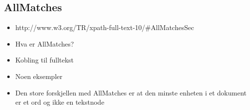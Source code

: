 \subsection{AllMatches}
\label{sect:theory:xquery:allmatches}
\begin{itemize}
  \item http://www.w3.org/TR/xpath-full-text-10/\#AllMatchesSec
  \item Hva er AllMatches?
  \item Kobling til fulltekst
  \item Noen eksempler
  \item Den store forskjellen med AllMatches er at den minste enheten i et 
        dokument er et ord og ikke en tekstnode
\end{itemize}
